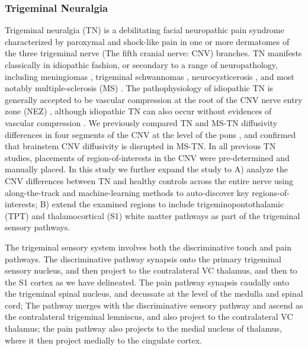 \subsubsection{Trigeminal Neuralgia}
Trigeminal neuralgia (TN) is a debilitating facial neuropathic pain syndrome characterized by paroxymal and shock-like pain in one or more dermatomes of the three trigeminal nerve (The fifth cranial nerve: CNV) branches. TN manifests classically in idiopathic fashion, or secondary to a range of neuropathology, including meningiomas \cite{Cheng2008}, trigeminal schwannomas \cite{Miller2008}, neurocysticerosis \cite{Revuelta1995}, and most notably multiple-sclerosis (MS) \cite{Cruccu2009,VanderMeijs2002,Nick2012}. The pathophysiology of idiopathic TN is generally accepted to be vascular compression at the root of the CNV nerve entry zone (NEZ) \cite{Linn2011,Love2001}, although idiopathic TN can also occur without evidences of vascular compression \cite{Lee2014}. We previously compared TN and MS-TN diffusivity differences in four segments of the CNV at the level of the pons \cite{Chen2016a}, and confirmed that brainstem CNV diffusivity is disrupted in MS-TN. In all previous TN studies, placements of region-of-interests in the CNV were pre-determined and manually placed. In this study we further expand the study to A) analyze the CNV differences between TN and healthy controls across the entire nerve using along-the-track and machine-learning methods to auto-discover key regions-of-interests; B) extend the examined regions to include trigeminopontothalamic (TPT) and thalamocortical (S1) white matter pathways as part of the trigeminal sensory pathways.

The trigeminal sensory system involves both the discriminative touch and pain pathways. The discriminative pathway synapsis onto the primary trigeminal sensory nucleus, and then project to the contralateral VC thalamus, and then to the S1 cortex as we have delineated. The pain pathway synapsis caudally onto the trigeminal spinal nucleus, and decussate at the level of the medulla and spinal cord; The pathway merges with the discriminative sensory pathway and ascend as the contralateral trigeminal lemniscus, and also project to the contralateral VC thalamus; the pain pathway also projects to the medial nucleus of thalamus, where it then project medially to the cingulate cortex. 

